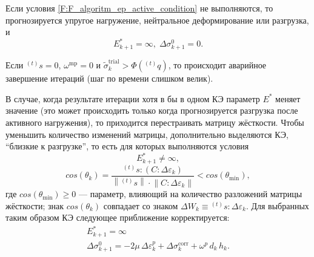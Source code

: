 \begin{enumerate}
	Если условия \eqref{F:F_algoritm_ep_active_condition} не выполняются, то прогнозируется упругое нагружение, нейтральное деформирование или разгрузка, и
	\begin{equation}
	E_{k+1}^*=\infty,\; \Delta\sigma_{k+1}^0=0.
	\label{F:F_algoritm_ep_new_unload}
	\end{equation}
	
	Если ${}^{(t)}s=0$, $\omega^{\mathrm{mp}}=0$ и $\tilde{\sigma}_k^{\mathrm{trial}}>\Phi\left({}^{(t)}q\right)$, то происходит аварийное завершение итераций (шаг по времени слишком велик).
	
	В случае, когда результате итерации хотя в бы в одном КЭ параметр $E^*$ меняет значение (это может происходить только когда прогнозируется разгрузка после активного нагружения), то приходится перестраивать матрицу жёсткости. Чтобы уменьшить количество изменений матрицы, дополнительно выделяются КЭ, \textquotedblleft близкие к разгрузке\textquotedblright, то есть для которых выполняются условия
	\begin{equation}
	E_{k+1}^*\neq\infty,
	\label{F:F_algoritm_unload_criterion1}
	\end{equation}
	\begin{equation}
	cos\left(\theta_k\right)=\frac{{}^{(t)}s:\left(C:\Delta\varepsilon_k\right) }{\left\|{}^{(t)}s\right\|\cdot \left\|C:\Delta\varepsilon_k\right\|}<cos\left(\theta_{\mathrm{min}}\right),
	\label{F:F_algoritm_unload_criterion2}
	\end{equation}
	где $cos\left(\theta_{\mathrm{min}}\right)\geqslant0$ --- параметр, влияющий на количество разложений матрицы жёсткости; знак $cos\left(\theta_k\right)$ совпадает со знаком $\Delta W_k\equiv{}^{(t)}s:\Delta\varepsilon_k$. Для выбранных таким образом КЭ следующее приближение корректируется:
	\begin{equation}
	\begin{gathered}
	\mbox{$E_{k+1}^*=\infty$}\\
	\Delta\sigma_{k+1}^0=-2\mu\,\Delta\varepsilon_{k}^p+\Delta\sigma_{k}^{\mathrm{corr}}+\omega^{p}\,d_k\,h_{k}.
	\label{F:F_algoritm_unload_correction}
	\end{gathered}
	\end{equation}
	

\end{enumerate}
